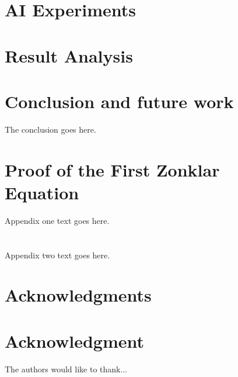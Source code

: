 \documentclass[12pt,journal,compsoc]{IEEEtran}
\begin{document}
\section{AI Experiments}


\section{Result Analysis}


\section{Conclusion and future work}
The conclusion goes here.

\appendices
\section{Proof of the First Zonklar Equation}
Appendix one text goes here.

\section{}
Appendix two text goes here.


\ifCLASSOPTIONcompsoc
  \section*{Acknowledgments}
\else
  \section*{Acknowledgment}
\fi
The authors would like to thank...


\ifCLASSOPTIONcaptionsoff
  \newpage
\fi

\end{document}
